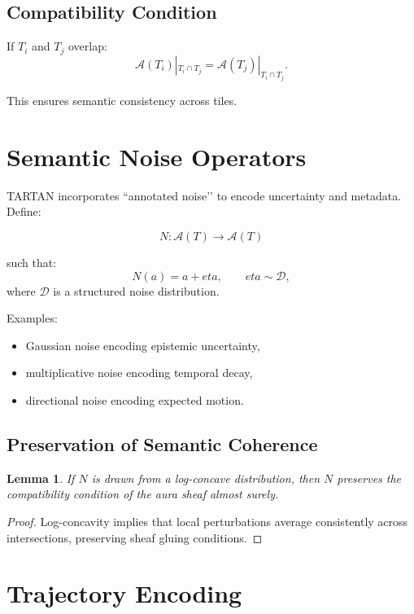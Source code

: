 \documentclass[12pt,oneside]{book}
\theoremstyle{plain}
\newtheorem{lemma}{Lemma}[chapter]
\theoremstyle{definition}
\def\eta{eta}%
\begin{document}
\subsection{Compatibility Condition}
If $T_i$ and $T_j$ overlap:
\[
\mathcal{A}(T_i)|_{T_i \cap T_j}
=
\mathcal{A}(T_j)|_{T_i \cap T_j}.
\]

This ensures semantic consistency across tiles.

\section{Semantic Noise Operators}

TARTAN incorporates ``annotated noise’’ to encode uncertainty and metadata.
Define:

\begin{equation}
N: \mathcal{A}(T) \to \mathcal{A}(T)
\end{equation}

such that:
\[
N(a) = a + \eta, \qquad \eta \sim \mathcal{D},
\]
where $\mathcal{D}$ is a structured noise distribution.

Examples:

\begin{itemize}
    \item Gaussian noise encoding epistemic uncertainty,
    \item multiplicative noise encoding temporal decay,
    \item directional noise encoding expected motion.
\end{itemize}

\subsection{Preservation of Semantic Coherence}

\begin{lemma}
If $N$ is drawn from a log-concave distribution, then $N$ preserves the
compatibility condition of the aura sheaf almost surely.
\end{lemma}

\begin{proof}
Log-concavity implies that local perturbations average consistently across
intersections, preserving sheaf gluing conditions.
\end{proof}

\section{Trajectory Encoding}
\end{document}
